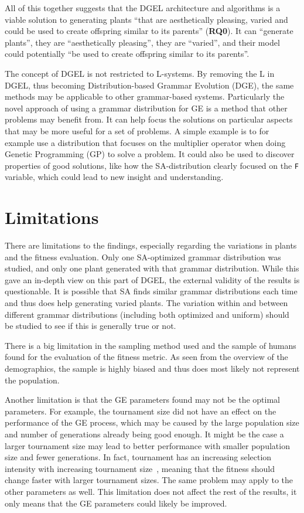 All of this together suggests that the DGEL architecture and algorithms is a viable solution to generating plants ``that are aesthetically pleasing, varied and could be used to create offspring similar to its parents'' (\textbf{RQ0}).
It can ``generate plants'', they are ``aesthetically pleasing'', they are ``varied'', and their model could potentially ``be used to create offspring similar to its parents''.

The concept of DGEL is not restricted to L-systems.
By removing the L in DGEL, thus becoming Distribution-based Grammar Evolution (DGE), the same methods may be applicable to other grammar-based systems.
Particularly the novel approach of using a grammar distribution for GE is a method that other problems may benefit from.
It can help focus the solutions on particular aspects that may be more useful for a set of problems.
A simple example is to for example use a distribution that focuses on the multiplier operator when doing Genetic Programming (GP) to solve a problem.
It could also be used to discover properties of good solutions, like how the SA-distribution clearly focused on the \texttt{F} variable, which could lead to new insight and understanding.

\section{Limitations}
There are limitations to the findings, especially regarding the variations in plants and the fitness evaluation.
Only one SA-optimized grammar distribution was studied, and only one plant generated with that grammar distribution.
While this gave an in-depth view on this part of DGEL, the external validity of the results is questionable.
It is possible that SA finds similar grammar distributions each time and thus does help generating varied plants.
The variation within and between different grammar distributions (including both optimized and uniform) should be studied to see if this is generally true or not.

There is a big limitation in the sampling method used and the sample of humans found for the evaluation of the fitness metric.
As seen from the overview of the demographics, the sample is highly biased and thus does most likely not represent the population.

Another limitation is that the GE parameters found may not be the optimal parameters.
For example, the tournament size did not have an effect on the performance of the GE process, which may be caused by the large population size and number of generations already being good enough.
It might be the case a larger tournament size may lead to better performance with smaller population size and fewer generations.
In fact, tournament has an increasing selection intensity with increasing tournament size~\cite{1995Blickle}, meaning that the fitness should change faster with larger tournament sizes.
The same problem may apply to the other parameters as well.
This limitation does not affect the rest of the results, it only means that the GE parameters could likely be improved.

